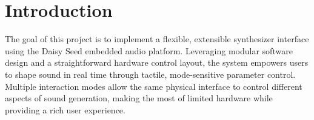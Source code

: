 \section{Introduction}
The goal of this project is to implement a flexible, extensible synthesizer interface using the Daisy Seed embedded audio platform. Leveraging modular software design and a straightforward hardware control layout, the system empowers users to shape sound in real time through tactile, mode-sensitive parameter control. Multiple interaction modes allow the same physical interface to control different aspects of sound generation, making the most of limited hardware while providing a rich user experience.
